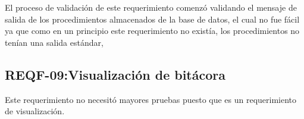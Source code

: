El proceso de validación de este requerimiento comenzó validando el mensaje de salida de los procedimientos almacenados de la base de datos, el cual no fue fácil ya que como en un principio este requerimiento no existía, los procedimientos no tenían una salida estándar,


\subsection{REQF-09:Visualización de bitácora}

Este requerimiento no necesitó mayores pruebas puesto que es un requerimiento de visualización.
